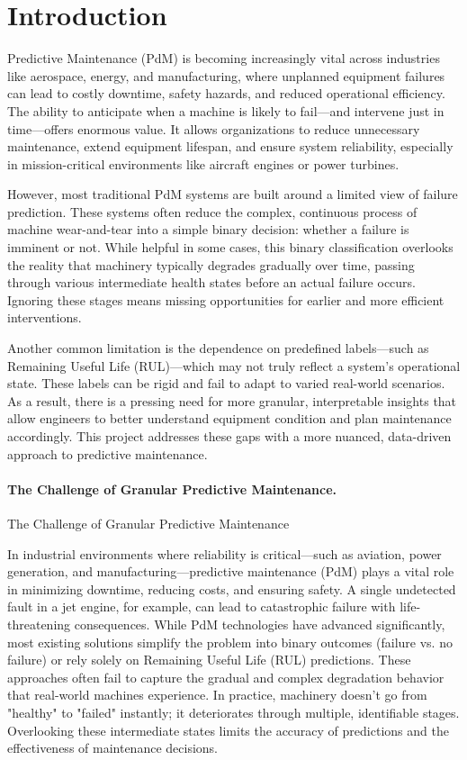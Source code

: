 \section{Introduction}
\label{sec:intro}
Predictive Maintenance (PdM) is becoming increasingly vital across industries like aerospace, energy, and manufacturing, where unplanned equipment failures can lead to costly downtime, safety hazards, and reduced operational efficiency. The ability to anticipate when a machine is likely to fail—and intervene just in time—offers enormous value. It allows organizations to reduce unnecessary maintenance, extend equipment lifespan, and ensure system reliability, especially in mission-critical environments like aircraft engines or power turbines.

However, most traditional PdM systems are built around a limited view of failure prediction. These systems often reduce the complex, continuous process of machine wear-and-tear into a simple binary decision: whether a failure is imminent or not. While helpful in some cases, this binary classification overlooks the reality that machinery typically degrades gradually over time, passing through various intermediate health states before an actual failure occurs. Ignoring these stages means missing opportunities for earlier and more efficient interventions.

Another common limitation is the dependence on predefined labels—such as Remaining Useful Life (RUL)—which may not truly reflect a system’s operational state. These labels can be rigid and fail to adapt to varied real-world scenarios. As a result, there is a pressing need for more granular, interpretable insights that allow engineers to better understand equipment condition and plan maintenance accordingly. This project addresses these gaps with a more nuanced, data-driven approach to predictive maintenance.

\paragraph{The Challenge of Granular Predictive Maintenance.}
The Challenge of Granular Predictive Maintenance

In industrial environments where reliability is critical—such as aviation, power generation, and manufacturing—predictive maintenance (PdM) plays a vital role in minimizing downtime, reducing costs, and ensuring safety. A single undetected fault in a jet engine, for example, can lead to catastrophic failure with life-threatening consequences. While PdM technologies have advanced significantly, most existing solutions simplify the problem into binary outcomes (failure vs. no failure) or rely solely on Remaining Useful Life (RUL) predictions. These approaches often fail to capture the gradual and complex degradation behavior that real-world machines experience. In practice, machinery doesn't go from "healthy" to "failed" instantly; it deteriorates through multiple, identifiable stages. Overlooking these intermediate states limits the accuracy of predictions and the effectiveness of maintenance decisions.

